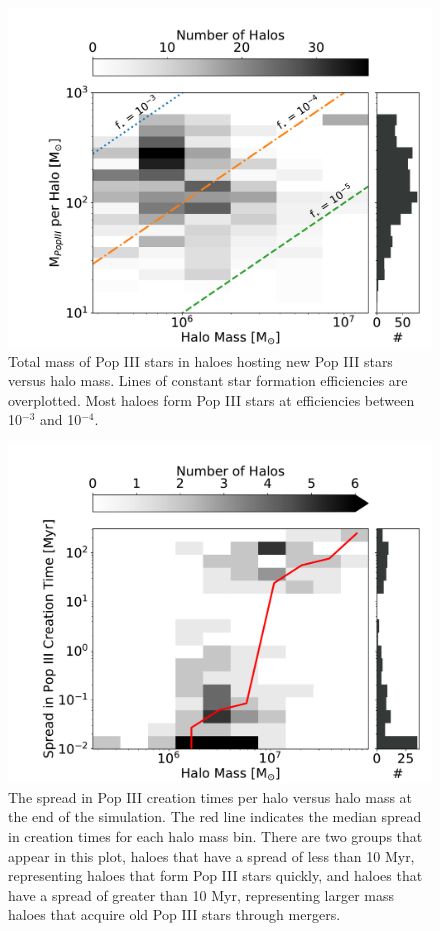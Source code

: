 \documentclass[fleqn,usenatbib]{mnras}
\begin{document}
\begin{figure}
	\includegraphics[width=\columnwidth]{images/totp3mass_halomass_sidehist.pdf}
    \caption{Total mass of Pop III stars in haloes hosting new Pop III stars versus halo mass. Lines of constant star formation efficiencies are overplotted. Most haloes form Pop III stars at efficiencies between 10$^{-3}$ and 10$^{-4}$.}
    \label{fig:totp3mass_halomass_sidehist}
\end{figure}

\begin{figure}
	\includegraphics[width=\columnwidth]{images/p3spread_mass.pdf}
    \caption{The spread in Pop III creation times per halo versus halo mass at the end of the simulation. The red line indicates the median spread in creation times for each halo mass bin. There are two groups that appear in this plot, haloes that have a spread of less than 10 Myr, representing haloes that form Pop III stars quickly, and haloes that have a spread of greater than 10 Myr, representing larger mass haloes that acquire old Pop III stars through mergers.}
    \label{fig:p3spread_mass}
\end{figure}
\end{document}

